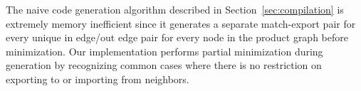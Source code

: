 
The naive code generation algorithm described in Section~\ref{sec:compilation} is extremely memory inefficient since it generates a separate match-export pair for every unique in edge/out edge pair for every node in the product graph before minimization. Our implementation performs partial minimization during generation by recognizing common cases where there is no restriction on exporting to or importing from neighbors.
